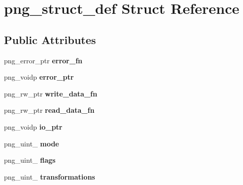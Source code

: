 \hypertarget{structpng__struct__def}{\section{png\-\_\-struct\-\_\-def Struct Reference}
\label{structpng__struct__def}
}
\subsection*{Public Attributes}
\begin{DoxyCompactItemize}
\item 
\hypertarget{structpng__struct__def_a2cc5bd1cf507373992a61cf725a730cd}{png\-\_\-error\-\_\-ptr {\bfseries error\-\_\-fn}}\label{structpng__struct__def_a2cc5bd1cf507373992a61cf725a730cd}

\item 
\hypertarget{structpng__struct__def_a06837611b772a6a44cf6306ea08d40a8}{png\-\_\-voidp {\bfseries error\-\_\-ptr}}\label{structpng__struct__def_a06837611b772a6a44cf6306ea08d40a8}

\item 
\hypertarget{structpng__struct__def_acc53cd87f0ffc4d1f67da7e10a94af39}{png\-\_\-rw\-\_\-ptr {\bfseries write\-\_\-data\-\_\-fn}}\label{structpng__struct__def_acc53cd87f0ffc4d1f67da7e10a94af39}

\item 
\hypertarget{structpng__struct__def_a83804076437d1587fab947c056bb56ae}{png\-\_\-rw\-\_\-ptr {\bfseries read\-\_\-data\-\_\-fn}}\label{structpng__struct__def_a83804076437d1587fab947c056bb56ae}

\item 
\hypertarget{structpng__struct__def_a996f6f8aaa00ede3bb147714ee7c480e}{png\-\_\-voidp {\bfseries io\-\_\-ptr}}\label{structpng__struct__def_a996f6f8aaa00ede3bb147714ee7c480e}

\item 
\hypertarget{structpng__struct__def_a6db33193ca2fdb01fa6d8da9756bd448}{png\-\_\-uint\-\_ {\bfseries mode}}\label{structpng__struct__def_a6db33193ca2fdb01fa6d8da9756bd448}

\item 
\hypertarget{structpng__struct__def_aa7529cc3d13e759037c504fddd6e1ae8}{png\-\_\-uint\-\_ {\bfseries flags}}\label{structpng__struct__def_aa7529cc3d13e759037c504fddd6e1ae8}

\item 
\hypertarget{structpng__struct__def_a4ab3e33248dd4c32880609a1a10fa725}{png\-\_\-uint\-\_ {\bfseries transformations}}\label{structpng__struct__def_a4ab3e33248dd4c32880609a1a10fa725}


\end{DoxyCompactItemize}
